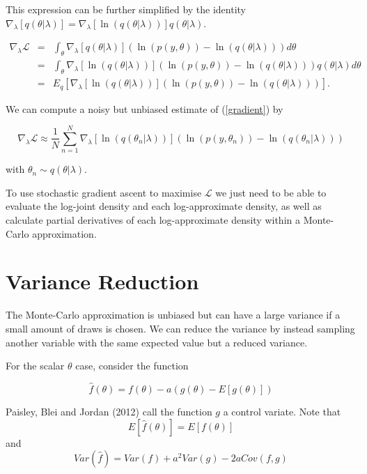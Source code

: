 \documentclass[12pt]{article}
\begin{document}
This expression can be further simplified by the identity $\nabla_{\lambda} [q(\theta | \lambda)] =  \nabla_{\lambda} [\ln(q(\theta | \lambda))]q(\theta | \lambda)$.

\begin{eqnarray}
\label{gradient}
\nabla_{\lambda} \mathcal{L} & = & \int_{\theta} \nabla_{\lambda} [q(\theta | \lambda)] \left( \ln (p(y, \theta)) - \ln(q(\theta | \lambda)) \right) d\theta \nonumber \\
& = &   \int_{\theta} \nabla_{\lambda} [\ln(q(\theta | \lambda))]\left( \ln (p(y, \theta)) - \ln(q(\theta | \lambda)) \right)q(\theta | \lambda) d\theta \nonumber \\
& = & E_q [  \nabla_{\lambda} [\ln(q(\theta | \lambda))]\left( \ln (p(y, \theta)) - \ln(q(\theta | \lambda)) \right)].
\end{eqnarray}

We can compute a noisy but unbiased estimate of (\ref{gradient}) by 

\begin{equation}
\label{mc}
\nabla_{\lambda}\mathcal{L} \approx \frac{1}{N}\sum_{n=1}^{N} \nabla_{\lambda} [\ln(q(\theta_n | \lambda))] (\ln (p(y, \theta_n)) - \ln(q(\theta_n | \lambda)))
\end{equation}

with $\theta_n \sim q(\theta | \lambda)$.

To use stochastic gradient ascent to maximise $\mathcal{L}$ we just need to be able to evaluate the log-joint density and each log-approximate density, as well as calculate partial derivatives of each log-approximate density within a Monte-Carlo approximation.

\section{Variance Reduction}

The Monte-Carlo approximation is unbiased but can have a large variance if a small amount of draws is chosen. We can reduce the variance by instead sampling another variable with the same expected value but a reduced variance. 

For the scalar $\theta$ case, consider the function

\begin{equation}
\label{control}
\hat{f}(\theta) = f(\theta) - a(g(\theta)-E[g(\theta)])
\end{equation}

Paisley, Blei and Jordan (2012) call the function $g$ a control variate. Note that
$$E[\hat{f}(\theta)] = E[f(\theta)]$$
and 
\begin{equation}
\label{var}
Var(\hat{f}) = Var(f) + a^2 Var(g) - 2a Cov(f, g)
\end{equation}
\end{document}

